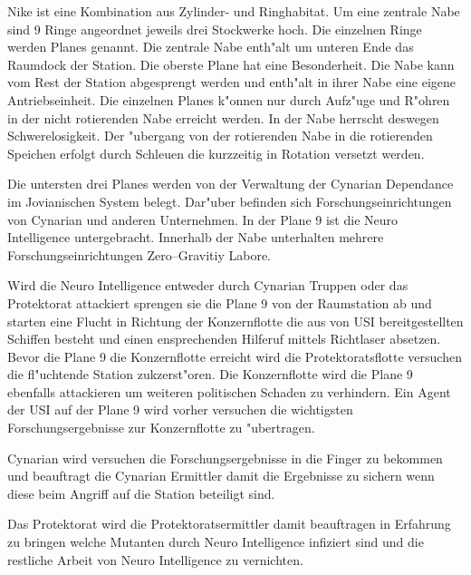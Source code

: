 Nike ist eine Kombination aus Zylinder- und Ringhabitat. Um eine zentrale Nabe sind 9 Ringe angeordnet jeweils drei Stockwerke hoch. Die einzelnen Ringe werden Planes genannt. Die zentrale Nabe enth"alt um unteren Ende das Raumdock der Station. Die oberste Plane hat eine Besonderheit. Die Nabe kann vom Rest der Station abgesprengt werden und enth"alt in ihrer Nabe eine eigene Antriebseinheit. Die einzelnen Planes k"onnen nur durch Aufz"uge und R"ohren in der nicht rotierenden Nabe erreicht werden. In der Nabe herrscht deswegen Schwerelosigkeit. Der "ubergang von der rotierenden Nabe in die rotierenden Speichen erfolgt durch Schleu\3en die kurzzeitig in Rotation versetzt werden.

Die untersten drei Planes werden von der Verwaltung der Cynarian Dependance im Jovianischen System belegt. Dar"uber befinden sich Forschungseinrichtungen von Cynarian und anderen Unternehmen. In der Plane 9 ist die Neuro Intelligence untergebracht. Innerhalb der Nabe unterhalten mehrere Forschungseinrichtungen Zero--Gravitiy Labore.

Wird die Neuro Intelligence entweder durch Cynarian Truppen oder das Protektorat attackiert sprengen sie die Plane 9 von der Raumstation ab und starten eine Flucht in Richtung der Konzernflotte die aus von USI bereitgestellten Schiffen besteht und einen ensprechenden Hilferuf mittels Richtlaser absetzen. Bevor die Plane 9 die Konzernflotte erreicht wird die Protektoratsflotte versuchen die fl"uchtende Station zukzerst"oren. Die Konzernflotte wird die Plane 9 ebenfalls attackieren um weiteren politischen Schaden zu verhindern. Ein Agent der USI auf der Plane 9 wird vorher versuchen die wichtigsten Forschungsergebnisse zur Konzernflotte zu "ubertragen.

Cynarian wird versuchen die Forschungsergebnisse in die Finger zu bekommen und beauftragt die Cynarian Ermittler damit die Ergebnisse zu sichern wenn diese beim Angriff auf die Station beteiligt sind.

Das Protektorat wird die Protektoratsermittler damit beauftragen in Erfahrung zu bringen welche Mutanten durch Neuro Intelligence infiziert sind und die restliche Arbeit von Neuro Intelligence zu vernichten.
